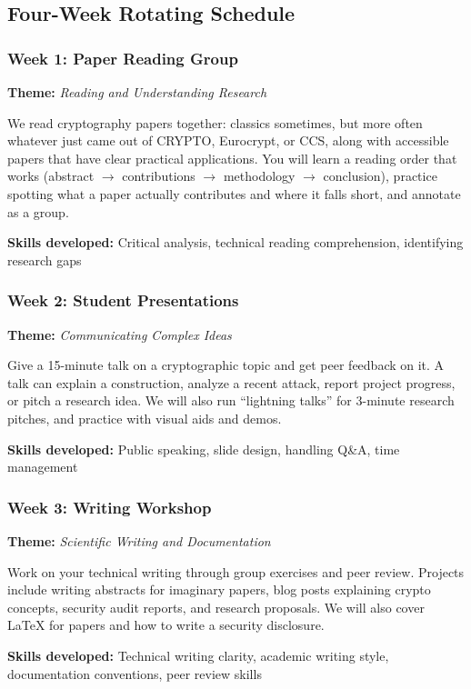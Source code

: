 \documentclass[10pt,a4paper,american]{exam}
\begin{document}
\subsection{Four-Week Rotating Schedule}

\subsubsection*{Week 1: Paper Reading Group}
\textbf{Theme:} \textit{Reading and Understanding Research}

We read cryptography papers together: classics sometimes, but more often whatever just came out of CRYPTO, Eurocrypt, or CCS, along with accessible papers that have clear practical applications. You will learn a reading order that works (abstract $\rightarrow$ contributions $\rightarrow$ methodology $\rightarrow$ conclusion), practice spotting what a paper actually contributes and where it falls short, and annotate as a group.

\textbf{Skills developed:} Critical analysis, technical reading comprehension, identifying research gaps

\subsubsection*{Week 2: Student Presentations}
\textbf{Theme:} \textit{Communicating Complex Ideas}

Give a 15-minute talk on a cryptographic topic and get peer feedback on it. A talk can explain a construction, analyze a recent attack, report project progress, or pitch a research idea. We will also run ``lightning talks'' for 3-minute research pitches, and practice with visual aids and demos.

\textbf{Skills developed:} Public speaking, slide design, handling Q\&A, time management

\subsubsection*{Week 3: Writing Workshop}
\textbf{Theme:} \textit{Scientific Writing and Documentation}

Work on your technical writing through group exercises and peer review. Projects include writing abstracts for imaginary papers, blog posts explaining crypto concepts, security audit reports, and research proposals. We will also cover LaTeX for papers and how to write a security disclosure.

\textbf{Skills developed:} Technical writing clarity, academic writing style, documentation conventions, peer review skills
\end{document}
